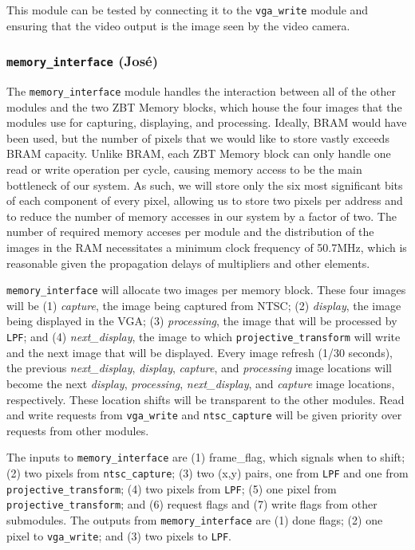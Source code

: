 \documentclass[10pt]{article}
\begin{document}
This module can be tested by connecting it to the {\tt vga\_write} module and ensuring that the video output is the image seen by the video camera.

\subsubsection{{\tt memory\_interface} (Jos\'{e})}
The {\tt memory\_interface} module handles the interaction between all of the other modules and the two ZBT Memory blocks, which house the four images that the modules use for capturing, displaying, and processing. Ideally, BRAM would have been used, but the number of pixels that we would like to store vastly exceeds BRAM capacity. Unlike BRAM, each ZBT Memory block can only handle one read or write operation per cycle, causing memory access to be the main bottleneck of our system. As such, we will store only the six most significant bits of each component of every pixel, allowing us to store two pixels per address and to reduce the number of memory accesses in our system by a factor of two. The number of required memory acceses per module and the distribution of the images in the RAM necessitates a minimum clock frequency of 50.7MHz, which is reasonable given the propagation delays of multipliers and other elements.

{\tt memory\_interface} will allocate two images per memory block. These four images will be (1) {\it capture}, the image being captured from NTSC; (2) {\it display}, the image being displayed in the VGA; (3) {\it processing}, the image that will be processed by {\tt LPF}; and (4) {\it next\_display}, the image to which {\tt projective\_transform} will write and the next image that will be displayed. Every image refresh (1/30 seconds), the previous {\it next\_display}, {\it display}, {\it capture}, and {\it processing} image locations will become the next {\it display}, {\it processing}, {\it next\_display}, and {\it capture} image locations, respectively. These location shifts will be transparent to the other modules. Read and write requests from {\tt vga\_write} and {\tt ntsc\_capture} will be given priority over requests from other modules.

The inputs to {\tt memory\_interface} are (1) frame\_flag, which signals when to shift; (2) two pixels from {\tt ntsc\_capture}; (3) two (x,y) pairs, one from {\tt LPF} and one from {\tt projective\_transform}; (4) two pixels from {\tt LPF}; (5) one pixel from {\tt projective\_transform}; and (6) request flags and (7) write flags from other submodules. The outputs from {\tt memory\_interface} are (1) done flags; (2) one pixel to {\tt vga\_write}; and (3) two pixels to {\tt LPF}.
\end{document}
